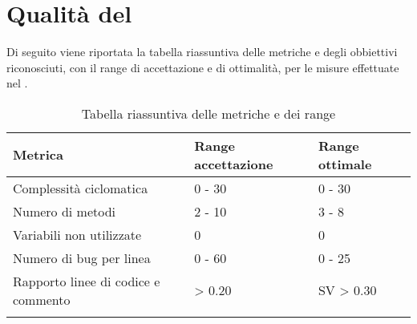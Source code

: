 \clearpage
\section{Qualità del }
Di seguito viene riportata la tabella riassuntiva delle metriche e degli obbiettivi riconosciuti, con il range di accettazione e di ottimalità, per le misure effettuate nel .
\begin{center}
	\centering
	\renewcommand{\arraystretch}{1.5}
	\begin{longtable}{  p{7cm}  p{3cm} p{2.5cm}  }
		\rowcolor{tableHeadYellow}
		\textbf{Metrica}   & \textbf{Range \mbox{accettazione}} & \textbf{Range \mbox{ottimale}} \\ 
		\endhead
		Complessità ciclomatica                & 0 - 30      &      0 - 30 \\
		Numero di metodi                       & 2 - 10      &      3 - 8 \\
		Variabili non utilizzate               & 0           &      0 \\
		Numero di bug per linea                & 0 - 60      &      0 - 25 \\
		Rapporto linee di codice e commento    & \textgreater { 0.20 }      & SV \textgreater { 0.30 } \\
		\rowcolor{white}
		\caption{Tabella riassuntiva delle metriche e dei range}
	\end{longtable}
\end{center}
